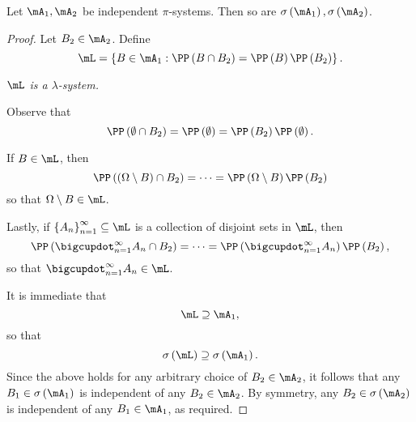 \documentclass[stat901]{subfiles}
\begin{document}
    \begin{theorem}{}
        Let $\mA_1,\mA_2$ be independent $\pi$-systems. Then so are $\sigma\left( \mA_1 \right),\sigma\left( \mA_2 \right)$.
    \end{theorem}

    \begin{proof}
        Let $B_2\in\mA_2$. Define
        \begin{equation*}
            \mL = \left\lbrace B\in\mA_1 : \PP\left( B\cap B_2 \right) = \PP\left( B \right)\PP\left( B_2 \right) \right\rbrace.
        \end{equation*}

        \begin{claim}
            \textit{$\mL$ is a $\lambda$-system.}

            Observe that
            \begin{equation*}
                \PP\left( \emptyset\cap B_2 \right) = \PP\left( \emptyset \right) = \PP\left( B_2 \right)\PP\left( \emptyset \right).
            \end{equation*}

            If $B\in\mL$, then
            \begin{equation*}
                \PP\left( \left( \Omega\setminus B \right)\cap B_2 \right) = \cdots = \PP\left( \Omega\setminus B \right)\PP\left( B_2 \right)
            \end{equation*}
            so that $\Omega\setminus B\in\mL$.

            Lastly, if $\left\lbrace A_n \right\rbrace^{\infty}_{n=1}\subseteq\mL$ is a collection of disjoint sets in $\mL$, then
            \begin{equation*}
                \PP\left( \bigcupdot^{\infty}_{n=1}A_n\cap B_2 \right) = \cdots = \PP\left( \bigcupdot^{\infty}_{n=1}A_n \right)\PP\left( B_2 \right),
            \end{equation*}
            so that $\bigcupdot^{\infty}_{n=1}A_n \in\mL$. 
        \end{claim}

        It is immediate that
        \begin{equation*}
            \mL\supseteq\mA_1,
        \end{equation*}
        so that
        \begin{equation*}
            \sigma\left( \mL \right)\supseteq\sigma\left( \mA_1 \right).
        \end{equation*}
        Since the above holds for any arbitrary choice of $B_2\in\mA_2$, it follows that any $B_1\in\sigma\left( \mA_1 \right)$ is independent of any $B_2\in\mA_2$. By symmetry, any $B_2\in\sigma\left( \mA_2 \right)$ is independent of any $B_1\in\mA_1$, as required.
    \end{proof}
\end{document}
